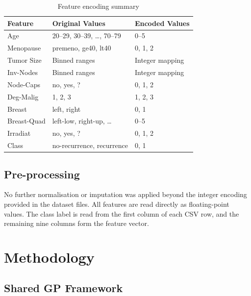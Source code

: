 \documentclass[12pt,a4paper]{article}
\begin{document}
\begin{table}[H]
\centering
\caption{Feature encoding summary}
\label{tab:features}
\begin{tabular}{lll}
\toprule
\textbf{Feature} & \textbf{Original Values} & \textbf{Encoded Values} \\
\midrule
Age              & 20--29, 30--39, \ldots, 70--79 & 0--5 \\
Menopause        & premeno, ge40, lt40            & 0, 1, 2 \\
Tumor Size       & Binned ranges                  & Integer mapping \\
Inv-Nodes        & Binned ranges                  & Integer mapping \\
Node-Caps        & no, yes, ?                     & 0, 1, 2 \\
Deg-Malig        & 1, 2, 3                        & 1, 2, 3 \\
Breast           & left, right                    & 0, 1 \\
Breast-Quad      & left-low, right-up, \ldots     & 0--5 \\
Irradiat         & no, yes, ?                     & 0, 1, 2 \\
\midrule
Class            & no-recurrence, recurrence      & 0, 1 \\
\bottomrule
\end{tabular}
\end{table}

\subsection{Pre-processing}

No further normalisation or imputation was applied beyond the integer encoding provided in the dataset files. All features are read directly as floating-point values. The class label is read from the first column of each CSV row, and the remaining nine columns form the feature vector.

\section{Methodology}

\subsection{Shared GP Framework}
\end{document}
